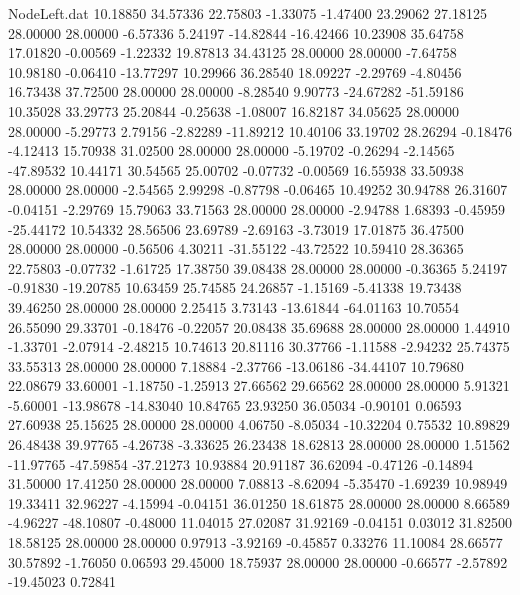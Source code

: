 \begin{filecontents}{NodeLeft.dat}
  10.18850   34.57336   22.75803    -1.33075   -1.47400   23.29062   27.18125   28.00000   28.00000   -6.57336    5.24197  -14.82844  -16.42466
  10.23908   35.64758   17.01820    -0.00569   -1.22332   19.87813   34.43125   28.00000   28.00000   -7.64758   10.98180   -0.06410  -13.77297
  10.29966   36.28540   18.09227    -2.29769   -4.80456   16.73438   37.72500   28.00000   28.00000   -8.28540    9.90773  -24.67282  -51.59186
  10.35028   33.29773   25.20844    -0.25638   -1.08007   16.82187   34.05625   28.00000   28.00000   -5.29773    2.79156   -2.82289  -11.89212
  10.40106   33.19702   28.26294    -0.18476   -4.12413   15.70938   31.02500   28.00000   28.00000   -5.19702   -0.26294   -2.14565  -47.89532
  10.44171   30.54565   25.00702    -0.07732   -0.00569   16.55938   33.50938   28.00000   28.00000   -2.54565    2.99298   -0.87798   -0.06465
  10.49252   30.94788   26.31607    -0.04151   -2.29769   15.79063   33.71563   28.00000   28.00000   -2.94788    1.68393   -0.45959  -25.44172
  10.54332   28.56506   23.69789    -2.69163   -3.73019   17.01875   36.47500   28.00000   28.00000   -0.56506    4.30211  -31.55122  -43.72522
  10.59410   28.36365   22.75803    -0.07732   -1.61725   17.38750   39.08438   28.00000   28.00000   -0.36365    5.24197   -0.91830  -19.20785
  10.63459   25.74585   24.26857    -1.15169   -5.41338   19.73438   39.46250   28.00000   28.00000    2.25415    3.73143  -13.61844  -64.01163
  10.70554   26.55090   29.33701    -0.18476   -0.22057   20.08438   35.69688   28.00000   28.00000    1.44910   -1.33701   -2.07914   -2.48215
  10.74613   20.81116   30.37766    -1.11588   -2.94232   25.74375   33.55313   28.00000   28.00000    7.18884   -2.37766  -13.06186  -34.44107
  10.79680   22.08679   33.60001    -1.18750   -1.25913   27.66562   29.66562   28.00000   28.00000    5.91321   -5.60001  -13.98678  -14.83040
  10.84765   23.93250   36.05034    -0.90101    0.06593   27.60938   25.15625   28.00000   28.00000    4.06750   -8.05034  -10.32204    0.75532
  10.89829   26.48438   39.97765    -4.26738   -3.33625   26.23438   18.62813   28.00000   28.00000    1.51562  -11.97765  -47.59854  -37.21273
  10.93884   20.91187   36.62094    -0.47126   -0.14894   31.50000   17.41250   28.00000   28.00000    7.08813   -8.62094   -5.35470   -1.69239
  10.98949   19.33411   32.96227    -4.15994   -0.04151   36.01250   18.61875   28.00000   28.00000    8.66589   -4.96227  -48.10807   -0.48000
  11.04015   27.02087   31.92169    -0.04151    0.03012   31.82500   18.58125   28.00000   28.00000    0.97913   -3.92169   -0.45857    0.33276
  11.10084   28.66577   30.57892    -1.76050    0.06593   29.45000   18.75937   28.00000   28.00000   -0.66577   -2.57892  -19.45023    0.72841

\end{filecontents}
